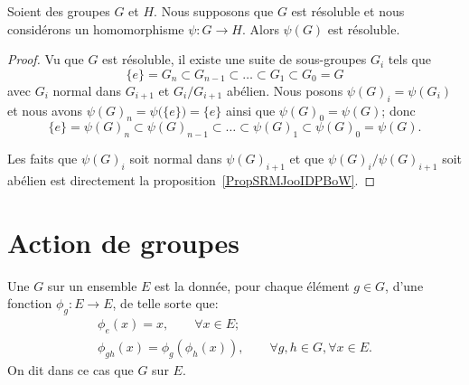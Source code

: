 \begin{proposition} \label{PropBNEZooJMDFIB}
    Soient des groupes \( G\) et \( H\). Nous supposons que \( G\) est résoluble et nous considérons un homomorphisme \( \psi\colon G\to H\). Alors \( \psi(G)\) est résoluble.
\end{proposition}

\begin{proof}
    Vu que \( G\) est résoluble, il existe une suite de sous-groupes \( G_i\) tels que
    \begin{equation}
        \{ e \}=G_n\subset G_{n-1}\subset\ldots\subset G_1\subset G_0=G
    \end{equation}
    avec \( G_i\) normal dans \( G_{i+1}\) et \( G_i/G_{i+1}\) abélien. Nous posons \( \psi(G)_i=\psi(G_i)\) et nous avons \( \psi(G)_n=\psi\big( \{ e \} \big)=\{ e \}\) ainsi que \( \psi(G)_0=\psi(G)\); donc
    \begin{equation}
        \{ e \}=\psi(G)_n\subset \psi(G)_{n-1}\subset\ldots\subset \psi(G)_1\subset \psi(G)_0=\psi(G).
    \end{equation}

    Les faits que \( \psi(G)_i\) soit normal dans \( \psi(G)_{i+1}\) et que \( \psi(G)_i/\psi(G)_{i+1}\) soit abélien est directement la proposition~\ref{PropSRMJooIDPBoW}.

\end{proof}


\section{Action de groupes}

\begin{definition}  \label{DefActionGroupe}
    Une  \( G\) sur un ensemble \( E\) est la donnée, pour chaque élément \( g \in G\), d'une fonction \(\phi_g : E \to E \), de telle sorte que:
    \begin{gather*}
        \phi_{e}(x) = x, \hspace{2em} \forall x \in E;\\
        \phi_{gh}(x) = \phi_g (\phi_h (x)),  \hspace{2em} \forall g,h \in G, \forall x \in E.
     \end{gather*}
     On dit dans ce cas que \( G \)  sur \( E \).
\end{definition}

